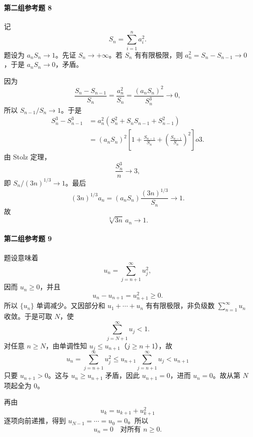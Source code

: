 \paragraph{第二组参考题 8}
\begin{xsolution}
记
\[
  S_n=\sum_{i=1}^n a_i^2.
\]
题设为 $a_nS_n\to1$。先证 $S_n\to+\infty$。若 $S_n$ 有有限极限，则 $a_n^2=S_n-S_{n-1}\to0$，于是 $a_nS_n\to0$，矛盾。

因为
\[
  \frac{S_n-S_{n-1}}{S_n}=\frac{a_n^2}{S_n}
  =\frac{(a_nS_n)^2}{S_n^3}\to0,
\]
所以 $S_{n-1}/S_n\to1$。于是
\begin{align*}
  S_n^3-S_{n-1}^3
  &=a_n^2(S_n^2+S_nS_{n-1}+S_{n-1}^2)\\
  &=(a_nS_n)^2\left[1+\frac{S_{n-1}}{S_n}
     +\left(\frac{S_{n-1}}{S_n}\right)^2\right]	o3.
\end{align*}
由 Stolz 定理，
\[
  \frac{S_n^3}{n}\to3,
\]
即 $S_n/(3n)^{1/3}\to1$。最后
\[
  (3n)^{1/3}a_n
  =(a_nS_n)\frac{(3n)^{1/3}}{S_n}\to1.
\]
故
\[
  \boxed{\sqrt[3]{3n}\,a_n\to1}.
\]
\end{xsolution}

\paragraph{第二组参考题 9}
\begin{xsolution}
题设意味着
\[
  u_n=\sum_{j=n+1}^{\infty}u_j^2,
\]
因而 $u_n\ge0$，并且
\[
  u_n-u_{n+1}=u_{n+1}^2\ge0.
\]
所以 $\{u_n\}$ 单调减少。又因部分和 $u_1+\cdots+u_n$ 有有限极限，非负级数 $\sum_{n=1}^{\infty}u_n$ 收敛。于是可取 $N$，使
\[
  \sum_{j=N+1}^{\infty}u_j<1.
\]
对任意 $n\ge N$，由单调性知 $u_j\le u_{n+1}$（$j\ge n+1$），故
\[
  u_n=\sum_{j=n+1}^{\infty}u_j^2
  \le u_{n+1}\sum_{j=n+1}^{\infty}u_j
  <u_{n+1}
\]
只要 $u_{n+1}>0$。这与 $u_n\ge u_{n+1}$ 矛盾，因此 $u_{n+1}=0$，进而 $u_n=0$。故从第 $N$ 项起全为 $0$。

再由
\[
  u_k=u_{k+1}+u_{k+1}^2
\]
逐项向前递推，得到 $u_{N-1}=\cdots=u_0=0$。所以
\[
  \boxed{u_n=0\quad\text{对所有 }n\ge0}.
\]
\end{xsolution}

